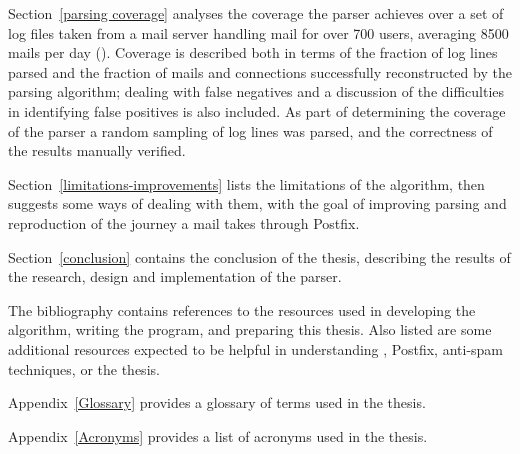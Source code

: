 Section~\ref{parsing coverage} analyses the coverage the parser achieves
over a set of \numberOFlogFILES{} log files taken from a mail server
handling mail for over 700 users, averaging 8500 mails per day
().  Coverage is described both
in terms of the fraction of log lines parsed and the fraction of mails and
connections successfully reconstructed by the parsing algorithm; dealing
with false negatives and a discussion of the difficulties in identifying
false positives is also included.  As part of determining the coverage of
the parser a random sampling of log lines was parsed, and the correctness
of the results manually verified.

Section~\ref{limitations-improvements} lists the limitations of the
algorithm, then suggests some ways of dealing with them, with the goal of
improving parsing and reproduction of the journey a mail takes through
Postfix.

Section~\ref{conclusion} contains the conclusion of the thesis, describing
the results of the research, design and implementation of the parser.

The bibliography contains references to the resources used in developing
the algorithm, writing the program, and preparing this thesis.  Also
listed are some additional resources expected to be helpful in
understanding \SMTP{}, Postfix, anti-spam techniques, or the thesis.

Appendix~\ref{Glossary} provides a glossary of terms used in the thesis.

Appendix~\ref{Acronyms} provides a list of acronyms used in the thesis.


